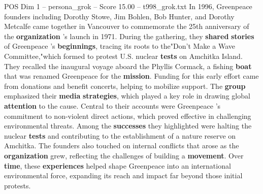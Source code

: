 \begin{textsample}{POS Dim 1 – persona\_grok – Score 15.00 – t998\_grok.txt}  \label{ex:f1_pos_039}
In 1996, Greenpeace founders including Dorothy Stowe, Jim Bohlen, Bob Hunter, and Dorothy Metcalfe came together in Vancouver to commemorate the 25th anniversary of the \textbf{organization} 's launch in 1971.
During the gathering, they \textbf{shared} \textbf{stories} of Greenpeace 's \textbf{beginnings}, tracing its roots to the"Don't Make a Wave Committee,"which formed to protest U.S. nuclear \textbf{tests} on Amchitka Island.
They recalled the inaugural voyage aboard the Phyllis Cormack, a fishing \textbf{boat} that was renamed Greenpeace for the \textbf{mission}.
Funding for this early effort came from donations and benefit concerts, helping to mobilize support.
The \textbf{group} emphasized their \textbf{media} \textbf{strategies}, which played a key role in drawing global \textbf{attention} to the cause.
Central to their accounts were Greenpeace 's commitment to non-violent direct actions, which proved effective in challenging environmental threats.
Among the \textbf{successes} they highlighted were halting the nuclear \textbf{tests} and contributing to the establishment of a nature reserve on Amchitka.
The founders also touched on internal conflicts that arose as the \textbf{organization} grew, reflecting the challenges of building a \textbf{movement}.
Over \textbf{time}, these \textbf{experiences} helped shape Greenpeace into an international environmental force, expanding its reach and impact far beyond those initial protests.

\end{textsample}
